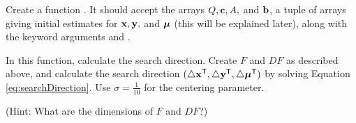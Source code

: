 \begin{problem}
Create a function .
It should accept the arrays $Q, \mathbf{c}, A,$ and $\mathbf{b}$, a tuple of arrays  giving initial estimates for $\mathbf{x}, \mathbf{y},$ and $\boldsymbol{\mu}$ (this will be explained later), along with the keyword arguments  and .

In this function, calculate the search direction.
Create $F$ and $DF$ as described above, and calculate the search direction $(\triangle \mathbf{x}^{\mathsf T} , \triangle \mathbf{y}^{\mathsf T} , \triangle \boldsymbol{\mu}^{\mathsf T} )$ by solving Equation \ref{eq:searchDirection}.
Use $\sigma = \frac{1}{10}$ for the centering parameter.

(Hint: What are the dimensions of $F$ and $DF$?)
\end{problem}

